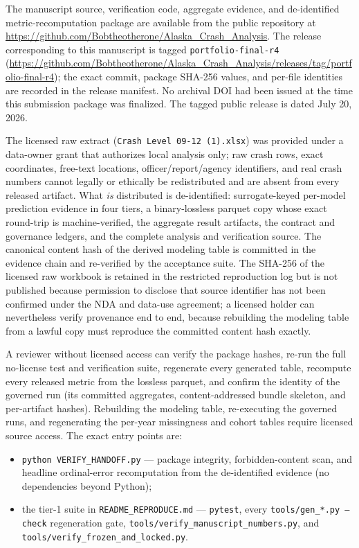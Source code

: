 \documentclass[11pt,letterpaper]{article}
\newcommand{\artifact}[1]{\begingroup\urlstyle{tt}\path{#1}\endgroup}
\begin{document}
The manuscript source, verification code, aggregate evidence, and de-identified metric-recomputation package are available from the public repository at \url{https://github.com/Bobtheotherone/Alaska_Crash_Analysis}. The release corresponding to this manuscript is tagged \texttt{portfolio-final-r4} (\url{https://github.com/Bobtheotherone/Alaska_Crash_Analysis/releases/tag/portfolio-final-r4}); the exact commit, package SHA-256 values, and per-file identities are recorded in the release manifest. No archival DOI had been issued at the time this submission package was finalized. The tagged public release is dated July 20, 2026.

The licensed raw extract (\texttt{Crash Level 09-12 (1).xlsx}) was provided under a data-owner grant that authorizes local analysis only; raw crash rows, exact coordinates, free-text locations, officer/report/agency identifiers, and real crash numbers cannot legally or ethically be redistributed and are absent from every released artifact. What \emph{is} distributed is de-identified: surrogate-keyed per-model prediction evidence in four tiers, a binary-lossless parquet copy whose exact round-trip is machine-verified, the aggregate result artifacts, the contract and governance ledgers, and the complete analysis and verification source. The canonical content hash of the derived modeling table is committed in the evidence chain and re-verified by the acceptance suite. The SHA-256 of the licensed raw workbook is retained in the restricted reproduction log but is not published because permission to disclose that source identifier has not been confirmed under the NDA and data-use agreement; a licensed holder can nevertheless verify provenance end to end, because rebuilding the modeling table from a lawful copy must reproduce the committed content hash exactly.

A reviewer without licensed access can verify the package hashes, re-run the full no-license test and verification suite, regenerate every generated table, recompute every released metric from the lossless parquet, and confirm the identity of the governed run \artifact{final_8af9d5bc23d8} (its committed aggregates, content-addressed bundle skeleton, and per-artifact hashes). Rebuilding the modeling table, re-executing the governed runs, and regenerating the per-year missingness and cohort tables require licensed source access. The exact entry points are:
\begin{itemize}
  \item \texttt{python VERIFY\_HANDOFF.py} --- package integrity, forbidden-content scan, and headline ordinal-error recomputation from the de-identified evidence (no dependencies beyond Python);
  \item the tier-1 suite in \texttt{README\_REPRODUCE.md} --- \texttt{pytest}, every \texttt{tools/gen\_*.py --check} regeneration gate, \texttt{tools/verify\_manuscript\_numbers.py}, and \texttt{tools/verify\_frozen\_and\_locked.py}.
\end{itemize}
\end{document}
